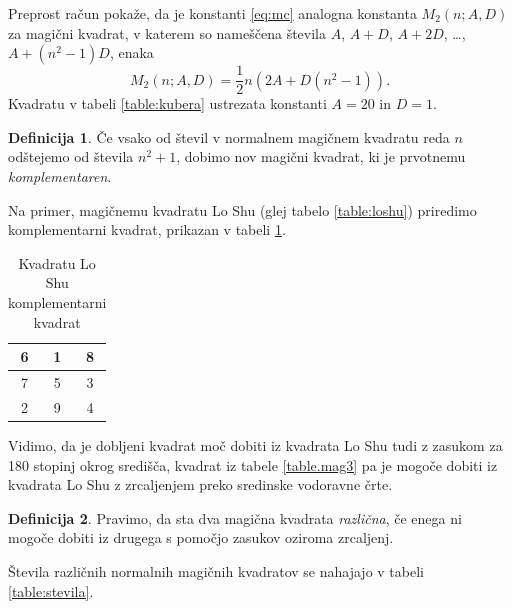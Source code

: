 \documentclass[a4paper,12pt]{article}
\theoremstyle{definition}
\newtheorem{definicija}{Definicija}
\theoremstyle{plain}
\begin{document}
Preprost račun pokaže, da je konstanti \eqref{eq:mc} analogna konstanta
$M_2(n;A,D)$ za magični kvadrat, v katerem so nameščena števila
$A$, $A+D$, $A+2D$, \dots, $A+(n^2-1)D$, enaka
\begin{equation}
M_2(n; A, D)=\frac{1}{2}n(2A+D(n^2-1)).   
\end{equation}
Kvadratu v tabeli \ref{table:kubera} ustrezata konstanti $A=20$ in $D=1$.

\begin{definicija}
   Če vsako od števil v normalnem magičnem kvadratu reda $n$ odštejemo
   od števila $n^2+1$, dobimo nov magični kvadrat, ki je prvotnemu
   \emph{komplementaren}.
\end{definicija}

Na primer, magičnemu kvadratu Lo Shu (glej tabelo \ref{table:loshu}) priredimo
komplementarni kvadrat, prikazan v tabeli \ref{table:closhu}.
%
\begin{table}[!ht]
   \centering
   \caption{Kvadratu Lo Shu komplementarni kvadrat}
   \label{table:closhu}
   \large
   \begin{tabular}{|c|c|c|}
      \hline
      6 & 1 & 8 \\\hline
      7 & 5 & 3 \\\hline
      2 & 9 & 4 \\\hline
   \end{tabular}
\end{table}

Vidimo, da je dobljeni kvadrat moč dobiti iz kvadrata Lo Shu tudi z zasukom za
180 stopinj okrog središča, kvadrat iz tabele \ref{table.mag3} pa je mogoče dobiti
iz kvadrata Lo Shu z zrcaljenjem preko sredinske vodoravne črte.

\begin{definicija}
   Pravimo, da sta dva magična kvadrata \emph{različna}, če enega ni mogoče dobiti
   iz drugega s pomočjo zasukov oziroma zrcaljenj.
\end{definicija}

Števila različnih normalnih magičnih kvadratov se nahajajo v tabeli \eqref{table:stevila}.
\end{document}
